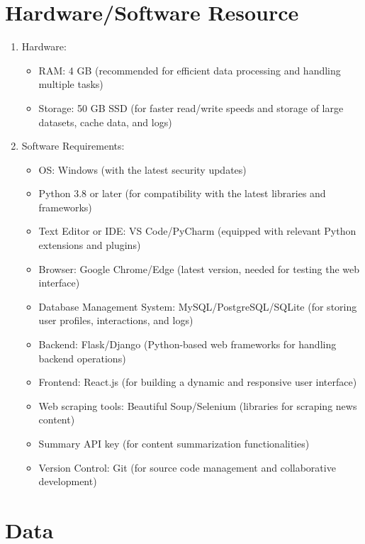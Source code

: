 \documentclass[a4paper]{article}
\begin{document}
\section{Hardware/Software Resource}

\begin{enumerate}
    \item Hardware:
    \begin{itemize}
        \item RAM: 4 GB (recommended for efficient data processing and handling multiple tasks)
        \item Storage: 50 GB SSD (for faster read/write speeds and storage of large datasets, cache data, and logs)
    \end{itemize}
    \item Software Requirements:
    \begin{itemize}
        \item OS: Windows (with the latest security updates)
        \item Python 3.8 or later (for compatibility with the latest libraries and frameworks)
        \item Text Editor or IDE: VS Code/PyCharm (equipped with relevant Python extensions and plugins)
        \item Browser: Google Chrome/Edge (latest version, needed for testing the web interface)
        \item Database Management System: MySQL/PostgreSQL/SQLite (for storing user profiles, interactions, and logs)
        \item Backend: Flask/Django (Python-based web frameworks for handling backend operations)
        \item Frontend: React.js (for building a dynamic and responsive user interface)
        \item Web scraping tools: Beautiful Soup/Selenium (libraries for scraping news content)
        \item Summary API key (for content summarization functionalities)
        \item Version Control: Git (for source code management and collaborative development)
    \end{itemize}
\end{enumerate}

\section{Data}
\end{document}

